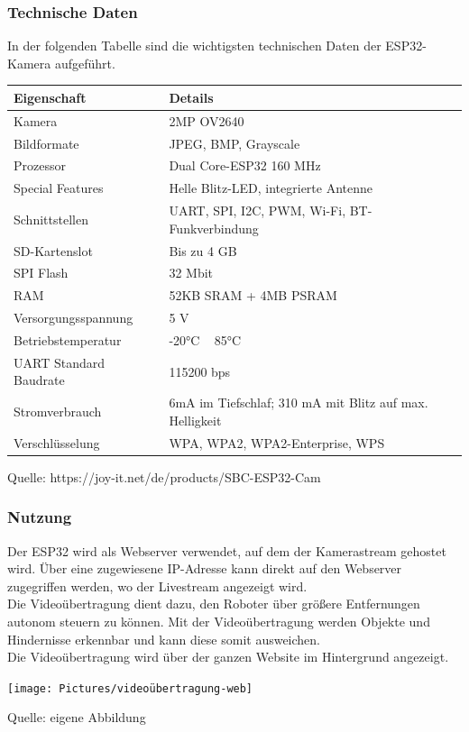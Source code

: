 \documentclass[ngerman,12pt,a4paper]{article}
\begin{document}
		\subsubsection{Technische Daten}
		In der folgenden Tabelle sind die wichtigsten technischen Daten der ESP32-Kamera aufgeführt.
		\begin{longtable}{| l | l |}
			\hline
			\textbf{Eigenschaft} & \textbf{Details} \\
			\hline
			Kamera & 2MP OV2640 \\
			\hline
			Bildformate & JPEG, BMP, Grayscale \\
			\hline
			Prozessor & Dual Core-ESP32 160 MHz \\
			\hline
			Special Features & Helle Blitz-LED, integrierte Antenne \\
			\hline
			Schnittstellen & UART, SPI, I2C, PWM, Wi-Fi, BT-Funkverbindung \\
			\hline
			SD-Kartenslot & Bis zu 4 GB \\
			\hline
			SPI Flash & 32 Mbit \\
			\hline
			RAM & 52KB SRAM + 4MB PSRAM \\
			\hline
			Versorgungsspannung & 5 V \\
			\hline
			Betriebstemperatur & -20°C ~ 85°C \\
			\hline
			UART Standard Baudrate & 115200 bps \\
			\hline
			Stromverbrauch & 6mA im Tiefschlaf; 310 mA mit Blitz auf max. Helligkeit \\
			\hline
			Verschlüsselung & WPA, WPA2, WPA2-Enterprise, WPS \\
			\hline
		\end{longtable}
		\vspace{-10pt}
		\noindent 
		\small Quelle: {https://joy-it.net/de/products/SBC-ESP32-Cam}
		\subsubsection{Nutzung}
		Der ESP32 wird als Webserver verwendet, auf dem der Kamerastream gehostet wird. Über eine zugewiesene IP-Adresse kann direkt auf den Webserver zugegriffen werden, wo der Livestream angezeigt wird. \\[0.5cm]
		Die Videoübertragung dient dazu, den Roboter über größere Entfernungen autonom steuern zu können. Mit der Videoübertragung werden Objekte und Hindernisse erkennbar und kann diese somit ausweichen. \\[0.5cm]
		Die Videoübertragung wird über der ganzen Website im Hintergrund angezeigt. \\
		\begin{center}
			\begin{minipage}[t]{1\textwidth}
				\texttt{[image: Pictures/videoübertragung-web]}
				\label{fig:videoübertragung-web}
				\vspace{-10pt}
				\begin{center}
					\par\small Quelle: eigene Abbildung 
				\end{center}
			\end{minipage} \\[0.75cm]
		\end{center}
\end{document}
